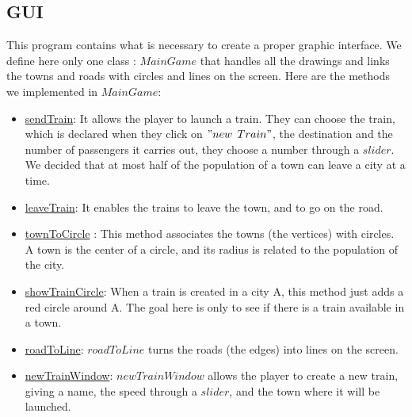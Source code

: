 \documentclass[a4paper]{article}
\begin{document}
	\subsection{GUI}
	This program contains what is necessary to create a proper graphic interface. We define here only one class : $MainGame$ that handles all the drawings and links the towns and roads with circles and lines on the screen.
	Here are the methods we implemented in $MainGame$:
	\begin{itemize}
		\item \underline{sendTrain}: It allows the player to launch a train. They can choose the train, which is declared when they click on $"new$ $Train"$, the destination and the number of passengers it carries out, they choose a number through a $slider$. We decided that at most half of the population of a town can leave a city at a time.  
		
		\item \underline{leaveTrain}: It enables the trains to leave the town, and to go on the road.
		
		\item \underline{townToCircle} : This method associates the towns (the vertices) with circles. A town is the center of a circle, and its radius is related to the population of the city. 
		
		\item \underline{showTrainCircle}: When a train is created in a city A, this method just adds a red circle around A. The goal here is only to see if there is a train available in a town.
		
		\item \underline{roadToLine}: $roadToLine$ turns  the roads (the edges) into lines on the screen.
		
		\item \underline{newTrainWindow}: $newTrainWindow$ allows the player to create a new train, giving a name, the speed through a $slider$, and the town where it will be launched.
		
	\end{itemize}
	
\end{document}
